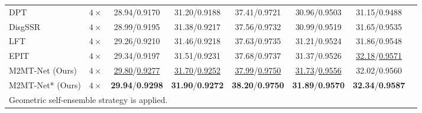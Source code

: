 \begin{table*}[t!]
\begin{tabular}{|l|c|c|c|c|c|c|c|}
    DPT \cite{wangDPT_AAAI2022}                 & $4\times$ & 28.94/0.9170                          & 31.20/0.9188                          & 37.41/0.9721                              & 30.96/0.9503                              & 31.15/0.9488 \\
    DisgSSR \cite{wangDistgSSR_TIP2022}         & $4\times$ & 28.99/0.9195                          & 31.38/0.9217                          & 37.56/0.9732                              & 30.99/0.9519                              & 31.65/0.9535 \\
    LFT \cite{liangLFT_SPL2022}                 & $4\times$ & 29.26/0.9210                          & 31.46/0.9218                          & 37.63/0.9735                              & 31.21/0.9524                              & 31.86/0.9548 \\
    EPIT \cite{liangEPIT_arXiv2023}             & $4\times$ & 29.34/0.9197                          & 31.51/0.9231                          & 37.68/0.9737                              & 31.37/0.9526                              & \underline{32.18}/\underline{0.9571} \\
    \hline
    M2MT-Net (Ours)                   & $4\times$ & \underline{29.80}/\underline{0.9277}  & \underline{31.70}/\underline{0.9252}  & \underline{37.99}/\underline{0.9750}      & \underline{31.73}/\underline{0.9556}      & 32.02/0.9560 \\
    M2MT-Net* (Ours)                  & $4\times$ & \textbf{29.94}/\textbf{0.9298}        & \textbf{31.90}/\textbf{0.9272}        & \textbf{38.20}/\textbf{0.9750}            & \textbf{31.89}/\textbf{0.9570}            & \textbf{32.34}/\textbf{0.9587} \\
    \hline
    \multicolumn{6}{l}{\scriptsize * Geometric self-ensemble strategy is applied.}
    \end{tabular}
\end{table*}